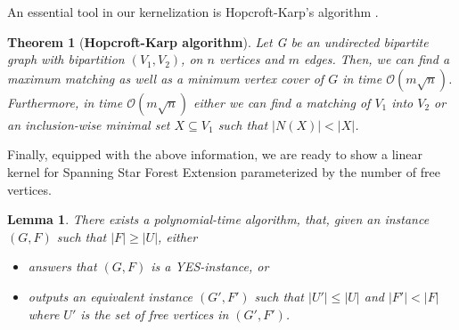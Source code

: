 \documentclass[en]{pracamgr}
\newtheorem{theorem}{Theorem}
\newtheorem{lemma}{Lemma}
\theoremstyle{definition}
\newcommand{\ssfep}{{\sc Spanning Star Forest Extension}}
\begin{document}
An essential tool in our kernelization is Hopcroft-Karp's algorithm \cite{Hopcroft-Karp}.

\begin{theorem}[\textbf{Hopcroft-Karp algorithm}]
	Let G be an undirected bipartite graph with bipartition $(V_1,V_2)$, on $n$ vertices and $m$ edges.	Then, we can find a maximum matching as well as a minimum vertex cover of $G$ in time $\mathcal{O}(m\sqrt{n})$. Furthermore, in time $\mathcal{O}(m\sqrt{n})$ either we can find a matching of $V_1$ into $V_2$ or an inclusion-wise minimal set $X \subseteq V_1$ such that $|N(X)| < |X|$.
\end{theorem}

Finally, equipped with the above information, we are ready to show a linear kernel for \ssfep{}  parameterized by the number of free vertices.

\begin{lemma}\label{kernel-ssfep}
	There exists a polynomial-time algorithm, that, given an instance $(G,F)$ such that $|F| \geq |U|$, either
	\begin{itemize}
		\item answers that $(G,F)$ is a YES-instance, or
		\item outputs an equivalent instance $(G',F')$ such that $|U'| \leq |U|$ and $|F'| < |F|$ where $U'$ is the set of free vertices in $(G',F')$.
	\end{itemize} 
\end{lemma}
\end{document}
